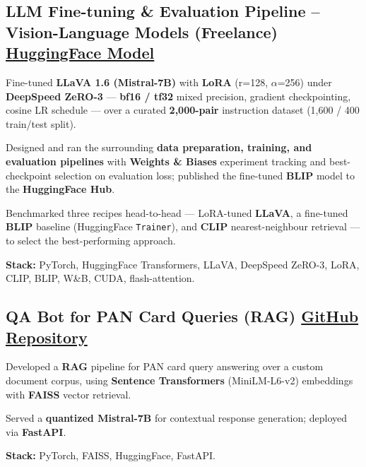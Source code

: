 \documentclass[letter,10pt]{article}
\begin{document}
\subsection{LLM Fine-tuning \& Evaluation Pipeline – Vision-Language Models (Freelance) \hfill \href{https://huggingface.co/sunil448832/blip-model}{HuggingFace Model}}
\begin{zitemize}
\item Fine-tuned \textbf{LLaVA 1.6 (Mistral-7B)} with \textbf{LoRA} (r=128, $\alpha$=256) under \textbf{DeepSpeed ZeRO-3} --- \textbf{bf16 / tf32} mixed precision, gradient checkpointing, cosine LR schedule --- over a curated \textbf{2{,}000-pair} instruction dataset (1{,}600 / 400 train/test split).
\item Designed and ran the surrounding \textbf{data preparation, training, and evaluation pipelines} with \textbf{Weights \& Biases} experiment tracking and best-checkpoint selection on evaluation loss; published the fine-tuned \textbf{BLIP} model to the \textbf{HuggingFace Hub}.
\item Benchmarked three recipes head-to-head --- LoRA-tuned \textbf{LLaVA}, a fine-tuned \textbf{BLIP} baseline (HuggingFace \texttt{Trainer}), and \textbf{CLIP} nearest-neighbour retrieval --- to select the best-performing approach.
\item \textbf{Stack:} PyTorch, HuggingFace Transformers, LLaVA, DeepSpeed ZeRO-3, LoRA, CLIP, BLIP, W\&B, CUDA, flash-attention.
\end{zitemize}

\subsection{QA Bot for PAN Card Queries (RAG) \hfill \href{https://github.com/sunil448832/Natural-Language-Processing/tree/master/RAG(Retrieval\%20Augment\%20Generation)}{GitHub Repository}}
\begin{zitemize}
\item Developed a \textbf{RAG} pipeline for PAN card query answering over a custom document corpus, using \textbf{Sentence Transformers} (MiniLM-L6-v2) embeddings with \textbf{FAISS} vector retrieval.
\item Served a \textbf{quantized Mistral-7B} for contextual response generation; deployed via \textbf{FastAPI}.
\item \textbf{Stack:} PyTorch, FAISS, HuggingFace, FastAPI.
\end{zitemize}
\end{document}
